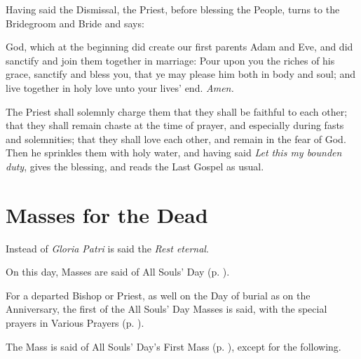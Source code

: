 \begin{rubric}
    Having said the Dismissal, the Priest, before blessing the People, turns to the Bridegroom and Bride and says:
\end{rubric}
 God, which at the beginning did create our first parents Adam and Eve, and did sanctify and join them together in marriage: Pour upon you the riches of his grace, sanctify and {} bless you, that ye may please him both in body and soul; and live together in holy love unto your lives' end. \textit{Amen.}
\begin{rubric}
    The Priest shall solemnly charge them that they shall be faithful to each other; that they shall remain chaste at the time of prayer, and especially during fasts and solemnities; that they shall love each other, and remain in the fear of God. Then he sprinkles them with holy water, and having said \emph{Let this my bounden duty}, gives the blessing, and reads the Last Gospel as usual.
\end{rubric}

\clearpage
\section{Masses for the Dead}\label{RequiemMasses}
\fancyhead[RE,LO]{}
\begin{rubric}
    Instead of \emph{Gloria Patri} is said the \emph{Rest eternal}.
\end{rubric}
\vspace{-2ex}
\begin{rubric}
    On this day, Masses are said of All Souls' Day (p. \pageref{AllSouls}).
\end{rubric}
\begin{rubric}
    For a departed Bishop or Priest, as well on the Day of burial as on the Anniversary, the first of the All Souls' Day Masses is said, with the special prayers in Various Prayers (p. \pageref{RequiemPrayers}).
\end{rubric}

\begin{rubric}
    The Mass is said of All Souls' Day's First Mass (p. \pageref{AllSouls}), except for the following.
\end{rubric}

